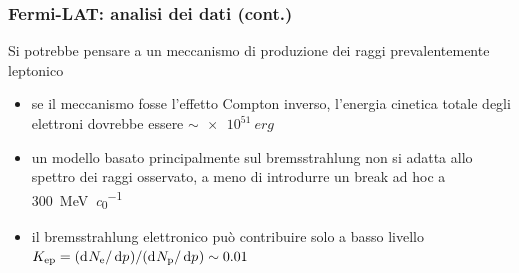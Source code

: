 \documentclass[10pt]{beamer}
\newcommand*{\dd}{\mathop{}\!\textup{d}} %
\newcommand*{\toder}[3][]{\frac{{\dd^{#1}}#2}{\dd {#3}^{#1}}}
\newcommand*{\ltoder}[3][]{{\dd^{#1}}#2/\dd {#3}^{#1}}
\newcommand{\pro}{\color{alerted text.fg}{\ding{51}}}
\newcommand{\con}{\color{alerted text.fg}{\ding{55}}}
\begin{document}

\begin{frame}
  \frametitle{Fermi-LAT: analisi dei dati (cont.)}
  Si potrebbe pensare a un meccanismo di produzione dei raggi \PGg
  prevalentemente leptonico
  \begin{itemize}
  \item[\con] se il meccanismo fosse l'effetto Compton inverso, l'energia
    cinetica totale degli elettroni dovrebbe essere $\sim \SI{e51}{erg}$
  \item[\con] un modello basato principalmente sul bremsstrahlung non si adatta
    allo spettro dei raggi \PGg osservato, a meno di introdurre un break ad hoc
    a \SI{300}{\mega\electronvolt\per\clight}
  \item[\pro] il bremsstrahlung elettronico può contribuire solo a basso livello
    $K_{\textup{ep}} = (\ltoder{N_{\textup{e}}}{p})/(\ltoder{N_{\textup{p}}}{p})
    \sim 0.01$
  \end{itemize}
\end{frame}
\end{document}
